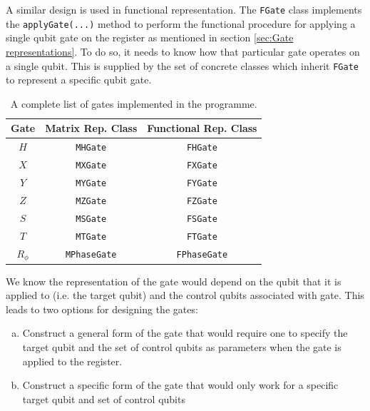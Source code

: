\documentclass[bibliography=totocnumbered, 10pt]{article}
\newenvironment{myenumerate}{%
  \edef\backupindent{\the\parindent}%
  \enumerate%
  \setlength{\parindent}{\backupindent}%
}{\endenumerate}
\theoremstyle{NoticeStyle}
\begin{document}
\begin{myenumerate}
A similar design is used in functional representation. The \texttt{FGate} class implements the \texttt{applyGate(...)} method to perform the functional procedure for applying a single qubit gate on the register as mentioned in section \ref{sec:Gate representations}. To do so, it needs to know how that particular gate operates on a single qubit. This is supplied by the set of concrete classes which inherit \texttt{FGate} to represent a specific qubit gate. 

\setlength{\extrarowheight}{3pt}
\begin{table}[h]
\begin{center}
\begin{tabular}{c | c | c}
	Gate & Matrix Rep. Class & Functional Rep. Class \\ \hline
	$H$ & \texttt{MHGate} & \texttt{FHGate} \\ 
	$X$ & \texttt{MXGate} & \texttt{FXGate} \\
	$Y$ & \texttt{MYGate} & \texttt{FYGate} \\
	$Z$ & \texttt{MZGate} & \texttt{FZGate} \\
	$S$ & \texttt{MSGate} & \texttt{FSGate} \\
	$T$ & \texttt{MTGate} & \texttt{FTGate} \\
	$R_\phi$ & \texttt{MPhaseGate} & \texttt{FPhaseGate} \\	
\end{tabular}
\caption{A complete list of gates implemented in the programme.}
\end{center}
\end{table}
	We know the representation of the gate would depend on the qubit that it is applied to (i.e. the target qubit) and the control qubits associated with gate. This leads to two options for designing the gates:
\begin{enumerate}[(a)]
	\item Construct a general form of the gate that would require one to specify the target qubit and the set of control qubits as parameters when the gate is applied to the register.
	\item Construct a specific form of the gate that would only work for a specific target qubit and set of control qubits


\end{enumerate}
\end{myenumerate}
\end{document}
